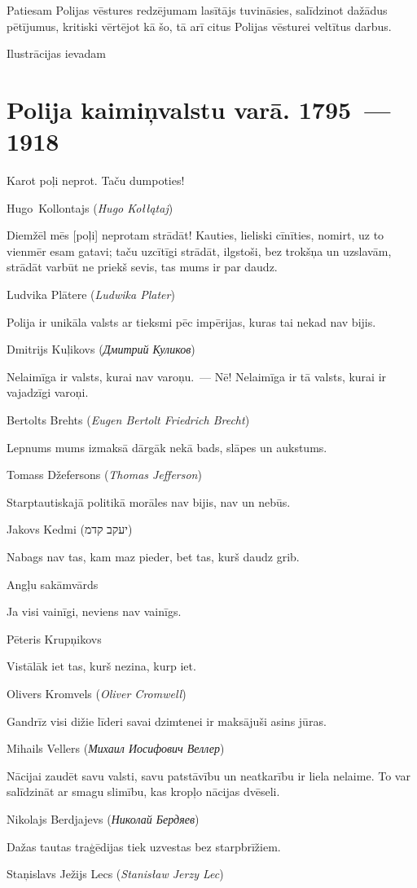 \documentclass[twoside,a5paper,12pt,fleqn,openany]{extbook}
\newcommand{\pltxti}[1]{\textit{\textpolish{#1}}}
\newcommand{\rutxti}[1]{\textit{\textrussian{#1}}}
\newcommand{\detxti}[1]{\textit{\textgerman{#1}}}
\newcommand{\entxti}[1]{\textit{\textenglish{#1}}}
\newcommand{\lttxti}[1]{\textit{\textlithuanian{#1}}}
\newcommand{\hetxti}[1]{\texthebrew{#1}}
\begin{document}
Patiesam Polijas vēstures redzējumam lasītājs tuvināsies, salīdzinot dažādus pētījumus, kritiski vērtējot kā šo, tā arī citus Polijas vēsturei veltītus darbus.

Ilustrācijas ievadam

\chapter{Polija kaimiņvalstu varā. 1795~--- 1918}

\epigraph
{Karot poļi neprot. Taču dumpoties!}
{Hugo~Kollontajs (\pltxti{Hugo Kołłątaj})}

\epigraph
{Diemžēl mēs [poļi] neprotam strādāt! Kauties, lieliski cīnīties, nomirt, uz to vienmēr esam gatavi; taču uzcītīgi strādāt, ilgstoši, bez trokšņa un uzslavām, strādāt varbūt ne priekš sevis, tas mums ir par daudz.}
{Ludvika Plātere (\lttxti{Ludwika Plater})}

\epigraph
{Polija ir unikāla valsts ar tieksmi pēc impērijas, kuras tai nekad nav bijis.}
{Dmitrijs Kuļikovs (\rutxti{Дмитрий Куликов})}

\newpage

\epigraph
{Nelaimīga ir valsts, kurai nav varoņu.~--- Nē! Nelaimīga ir tā valsts, kurai ir vajadzīgi varoņi.}
{Bertolts Brehts (\detxti{Eugen Bertolt Friedrich Brecht})}

\epigraph
{Lepnums mums izmaksā dārgāk nekā bads, slāpes un aukstums.}
{Tomass Džefersons (\entxti{Thomas Jefferson})}

\epigraph
{Starptautiskajā politikā morāles nav bijis, nav un nebūs.}
{Jakovs Kedmi (\hetxti{יעקב קדמ})}

\epigraph
{Nabags nav tas, kam maz pieder, bet tas, kurš daudz grib.}
{Angļu sakāmvārds}

\epigraph
{Ja visi vainīgi, neviens nav vainīgs.}
{Pēteris Krupņikovs}

\epigraph
{Vistālāk iet tas, kurš nezina, kurp iet.}
{Olivers Kromvels (\entxti{Oliver Cromwell})}

\newpage

\epigraph
{Gandrīz visi dižie līderi savai dzimtenei ir maksājuši asins jūras.}
{Mihails Vellers (\rutxti{Михаил Иосифович Веллер})}

\epigraph
{Nācijai zaudēt savu valsti, savu patstāvību un neatkarību ir liela nelaime. To var salīdzināt ar smagu slimību, kas kropļo nācijas dvēseli.}
{Nikolajs Berdjajevs (\rutxti{Николай Бердяев})}

\epigraph
{Dažas tautas traģēdijas tiek uzvestas bez starpbrīžiem.}
{Staņislavs Ježijs Lecs (\pltxti{Stanisław Jerzy Lec})}
\end{document}
